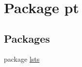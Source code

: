 \hypertarget{namespacept}{}\section{Package pt}
\label{namespacept}
\subsection*{Packages}
\begin{DoxyCompactItemize}
\item 
package \hyperlink{namespacept_1_1lsts}{lsts}
\end{DoxyCompactItemize}
